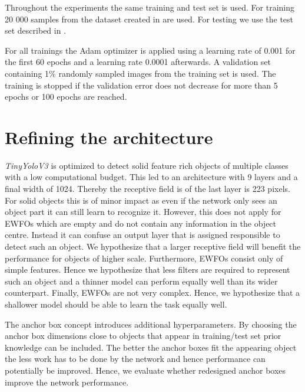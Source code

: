 	Throughout the experiments the same training and test set is used. For training 20 000 samples from the dataset created in  are used. For testing we use the test set described in .

	For all trainings the Adam optimizer is applied using a learning rate of 0.001 for the first 60 epochs and a learning rate 0.0001 afterwards. A validation set containing 1\% randomly sampled images from the training set is used. The training is stopped if the validation error does not decrease for more than 5 epochs or 100 epochs are reached.
	
	\section{Refining the architecture}
	
	\textit{TinyYoloV3} is optimized to detect solid feature rich objects of multiple classes with a low computational budget. This led to an architecture with 9 layers and a final width of 1024. Thereby the receptive field is of the last layer is 223 pixels. For solid objects this is of minor impact as even if the network only sees an object part it can still learn to recognize it. However, this does not apply for \acp{EWFO} which are empty and do not contain any information in the object centre. Instead it can confuse an output layer that is assigned responsible to detect such an object. We hypothesize that a larger receptive field will benefit the performance for objects of higher scale. Furthermore, \acp{EWFO} consist only of simple features. Hence we hypothesize that less filters are required to represent such an object and a thinner model can perform equally well than its wider counterpart. Finally, \acp{EWFO} are not very complex. Hence, we hypothesize that a shallower model should be able to learn the task equally well.
	
	The anchor box concept introduces additional hyperparameters. By choosing the anchor box dimensions close to objects that appear in training/test set prior knowledge can be included. The better the anchor boxes fit the appearing object the less work has to be done by the network and hence performance can potentially be improved. Hence, we evaluate whether redesigned anchor boxes improve the network performance. 
	
